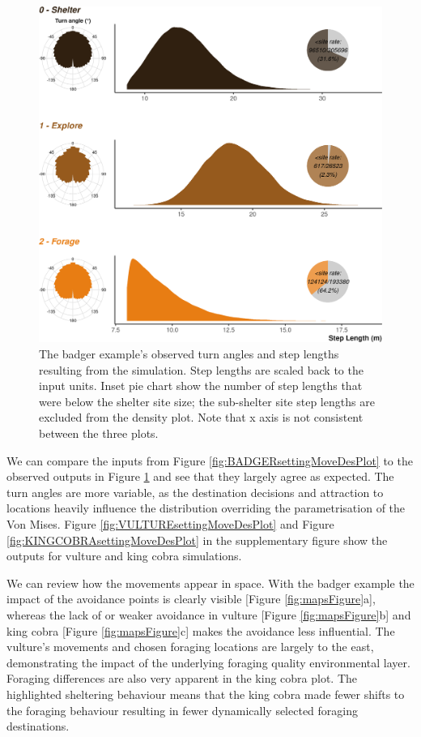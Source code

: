 \documentclass[10pt,a4paper]{article}
\begin{document}
\begin{figure}

{\centering \includegraphics{Agent-based_model_walkthrough_files/figure-latex/BADGERmoveCharFigure-1} 

}

\caption{The badger example's observed turn angles and step lengths resulting from the simulation. Step lengths are scaled back to the input units. Inset pie chart show the number of step lengths that were below the shelter site size; the sub-shelter site step lengths are excluded from the density plot. Note that x axis is not consistent between the three plots.}\label{fig:BADGERmoveCharFigure}
\end{figure}

We can compare the inputs from Figure \ref{fig:BADGERsettingMoveDesPlot} to the observed outputs in Figure \ref{fig:BADGERmoveCharFigure} and see that they largely agree as expected.
The turn angles are more variable, as the destination decisions and attraction to locations heavily influence the distribution overriding the parametrisation of the Von Mises.
Figure \ref{fig:VULTUREsettingMoveDesPlot} and Figure \ref{fig:KINGCOBRAsettingMoveDesPlot} in the supplementary figure show the outputs for vulture and king cobra simulations.

We can review how the movements appear in space.
With the badger example the impact of the avoidance points is clearly visible {[}Figure \ref{fig:mapsFigure}a{]}, whereas the lack of or weaker avoidance in vulture {[}Figure \ref{fig:mapsFigure}b{]} and king cobra {[}Figure \ref{fig:mapsFigure}c{]} makes the avoidance less influential.
The vulture's movements and chosen foraging locations are largely to the east, demonstrating the impact of the underlying foraging quality environmental layer.
Foraging differences are also very apparent in the king cobra plot.
The highlighted sheltering behaviour means that the king cobra made fewer shifts to the foraging behaviour resulting in fewer dynamically selected foraging destinations.
\end{document}
